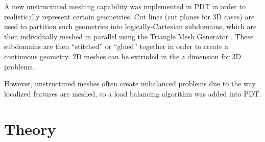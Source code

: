 \documentclass{anstrans}
\begin{document}
A new unstructured meshing capability was implemented in PDT in order to realistically represent certain geometries. Cut lines (cut planes for 3D cases) are used to partition such geometries into logically-Cartesian subdomains, which are then individually meshed in parallel using the Triangle Mesh Generator \cite{triangle}. These subdomains are then ``stitched'' or ``glued'' together in order to create a continuous geometry. 2D meshes can be extruded in the $z$ dimension for 3D problems. 

However, unstructured meshes often create unbalanced problems due to the way localized features are meshed, so a load balancing algorithm was added into PDT. 


\section{Theory}
\end{document}
